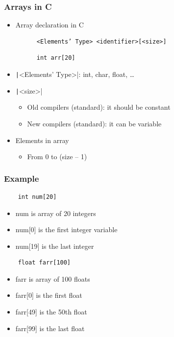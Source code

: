 \documentclass{../c-lecture}
\begin{document}
\begin{frame}[fragile]
  \frametitle{Arrays in C}
  \begin{itemize}
    \item Array declaration in C
    \begin{verbatim}
      <Elements’ Type> <identifier>[<size>]
    \end{verbatim}
    \begin{verbatim}
      int arr[20]
    \end{verbatim}
    \item
      \texttt|<Elements’ Type>|: int, char, float,
      \ldots
    \item \texttt|<size>|
    \begin{itemize}
      \item Old compilers (standard): it should be constant
      \item New compilers (standard): it can be variable
    \end{itemize}
    \item Elements in array
    \begin{itemize}
      \item From 0 to (size – 1)
    \end{itemize}
  \end{itemize}
\end{frame}

\begin{frame}[fragile]
  \frametitle{Example}
  \begin{verbatim}
    int num[20]
  \end{verbatim}
  \begin{itemize}
    \item num is array of 20 integers
    \item num[0] is the first integer variable
    \item num[19] is the last integer
  \end{itemize}
  \begin{verbatim}
    float farr[100]
  \end{verbatim}
  \begin{itemize}
    \item farr is array of 100 floats
    \item farr[0] is the first float
    \item farr[49] is the 50th float
    \item farr[99] is the last float
  \end{itemize}
\end{frame}
\end{document}
